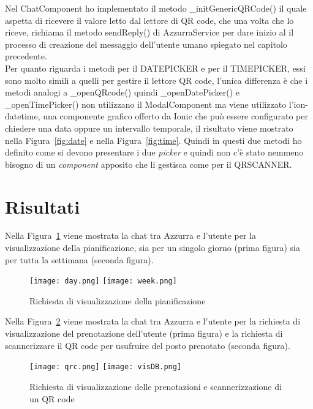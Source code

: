   Nel ChatComponent ho implementato il metodo \_initGenericQRCode() il quale aspetta di ricevere il valore letto dal lettore di \gls{QR code}\ap{[g]}, che una volta che lo riceve, richiama il metodo sendReply() di AzzurraService per dare inizio al il processo di creazione del messaggio dell'utente umano spiegato nel capitolo precedente. \\
  
  Per quanto riguarda i metodi per il DATEPICKER e per il TIMEPICKER, essi sono molto simili a quelli per gestire il lettore \gls{QR code}\ap{[g]}, l'unica differenza è che i metodi analogi a \_openQRcode() quindi \_openDatePicker() e \_openTimePicker() non utilizzano il ModalComponent ma viene utilizzato l'ion-datetime, una componente grafico offerto da Ionic che può essere configurato per chiedere una data oppure un intervallo temporale, il risultato viene mostrato nella Figura~\ref{fig:date} e nella Figura~\ref{fig:time}. Quindi in questi due metodi ho definito come si devono presentare i due \emph{picker} e quindi non c'è stato nemmeno bisogno di un \emph{component} apposito che li gestisca come per il QRSCANNER. 
\section{Risultati}

Nella Figura~\ref{fig:planning} viene mostrata la chat tra Azzurra e l'utente per la visualizzazione della pianificazione, sia per un singolo giorno (prima figura) sia per tutta la settimana (seconda figura).\\

\begin{figure}[h]
	\begin{center}
		\texttt{[image: day.png]}\hfil
		\texttt{[image: week.png]}
		\caption{Richiesta di visualizzazione della pianificazione}\label{fig:planning}
	\end{center}
\end{figure}

Nella Figura~\ref{fig:QRc} viene mostrata la chat tra Azzurra e l'utente per la richiesta di visualizzazione del prenotazione dell'utente (prima figura) e la richiesta di scannerizzare il \gls{QR code}\ap{[g]} per usufruire del posto prenotato (seconda figura).\\

\begin{figure}[h]
	\begin{center}
		\texttt{[image: qrc.png]}\hfil
		\texttt{[image: visDB.png]}
		\caption{Richiesta di visualizzazione delle prenotazioni e scannerizzazione di un QR code}\label{fig:QRc}
	\end{center}
\end{figure}

